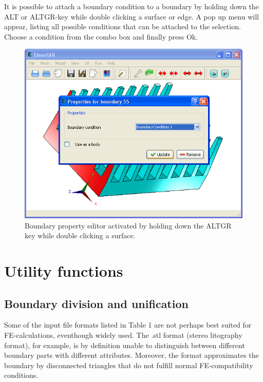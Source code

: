 \documentclass[a4paper,12pt]{article}
\begin{document}
It is possible to attach a boundary condition to a boundary by holding down 
the ALT or ALTGR-key while double clicking a surface or edge. A pop up menu will appear, listing all possible conditions that can be attached to the selection. 
Choose a condition from the combo box and finally press Ok.

\begin{figure}[ht]
\begin{center}
 \includegraphics[scale=0.5]{images/boundaryproperties.png}
\caption{Boundary property editor activated by holding down the ALTGR key while double
clicking a surface.}
\end{center}
\end{figure}

\section{Utility functions}

\subsection{Boundary division and unification}

Some of the input file formats listed in Table 1 are not perhaps best suited for
FE-calculations, eventhough widely used. The .stl format (stereo litography format),
for example, is by definition unable to distinguish between different boundary parts
with different attributes. Moreover, the format approximates the boundary by disconnected
triangles that do not fulfill normal FE-compatibility conditions.
\end{document}
